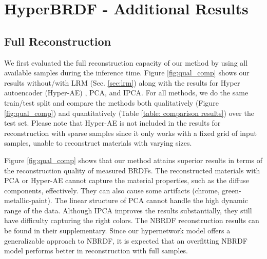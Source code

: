 \chapter{HyperBRDF - Additional Results}
\label{hyperbrdf:add_res}

\section{Full Reconstruction}\label{sec:full_rec}

We first evaluated the full reconstruction capacity of our method by using all available samples during the inference time. Figure \ref{fig:qual_comp} shows our results without/with LRM (Sec. \ref{sec:lrm}) along with the results for Hyper autoencoder (Hyper-AE) \cite{sztrajman2021neural}, PCA, and IPCA. For all methods, we do the same train/test split and compare the methods both qualitatively (Figure \ref{fig:qual_comp}) and quantitatively (Table \ref{table: comparison results}) over the test set. Please note that Hyper-AE is not included in the results for reconstruction with sparse samples since it only works with a fixed grid of input samples, unable to reconstruct materials with varying sizes. 


Figure \ref{fig:qual_comp} shows that our method attains superior results in terms of the reconstruction quality of measured BRDFs. The reconstructed materials with PCA or Hyper-AE cannot capture the material properties, such as the diffuse components, effectively. They can also cause some artifacts (chrome, green-metallic-paint). The linear structure of PCA cannot handle the high dynamic range of the data. Although IPCA \cite{nielsen2015optimal} improves the results substantially, they still have difficulty capturing the right colors. The NBRDF \cite{sztrajman2021neural} reconstruction results can be found in their supplementary. Since our hypernetwork model offers a generalizable approach to NBRDF, it is expected that an overfitting NBRDF model performs better in reconstruction with full samples. 

